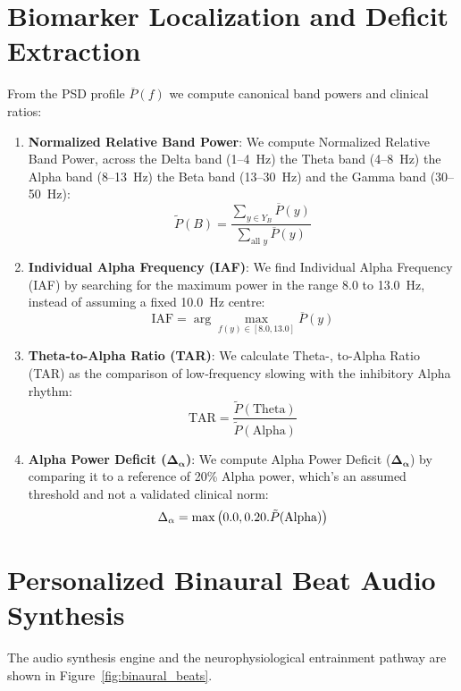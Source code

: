 \documentclass[12pt, a4paper]{report}
\begin{document}
\section{Biomarker Localization and Deficit Extraction}
\label{sec:biomarker_extraction}
From the PSD profile $\overline{P}(f)$ we compute canonical band powers and clinical ratios:
\begin{enumerate}
    \item \textbf{Normalized Relative Band Power}: We compute Normalized Relative Band Power, across the Delta band (1–4~Hz) the Theta band (4–8~Hz) the Alpha band (8–13~Hz) the Beta band (13–30~Hz) and the Gamma band (30–50~Hz):
    \begin{equation}
        \tilde{P}(B) = \frac{\sum_{y \in Y_B} \overline{P}(y)}{\sum_{\text{all } y} \overline{P}(y)}
        \label{eq:norm_band_power}
    \end{equation}
    
    \item \textbf{Individual Alpha Frequency (IAF)}: We find Individual Alpha Frequency (IAF) by searching for the maximum power in the range 8.0 to 13.0~Hz, instead of assuming a fixed 10.0~Hz centre:
    \begin{equation}
        \text{IAF} = \arg\max_{f(y) \in [8.0, 13.0]} \overline{P}(y)
        \label{eq:iaf_argmax}
    \end{equation}
    \item \textbf{Theta-to-Alpha Ratio (TAR)}: We calculate Theta-, to-Alpha Ratio (TAR) as the comparison of low‑frequency slowing with the inhibitory Alpha rhythm:
    \begin{equation}
        \text{TAR} = \frac{\tilde{P}(\text{Theta})}{\tilde{P}(\text{Alpha})}
        \label{eq:tar_ratio}
    \end{equation}
    \item \textbf{Alpha Power Deficit ($\boldsymbol{\Delta_{\boldsymbol{\alpha}}}$)}: We compute Alpha Power Deficit ($\boldsymbol{\Delta_{\boldsymbol{\alpha}}}$) by comparing it to a reference of 20\% Alpha power, which's an assumed threshold and not a validated clinical norm:
    \begin{equation}
        \Delta_{\alpha} = \max\left(0.0, 0.20. \Tilde{P}(\text{Alpha})\right)
        \label{eq:alpha_deficit}
    \end{equation}
\end{enumerate}

\section{Personalized Binaural Beat Audio Synthesis}
\label{sec:audio_synthesis}
The audio synthesis engine and the neurophysiological entrainment pathway are shown in Figure~\ref{fig:binaural_beats}.
\end{document}
